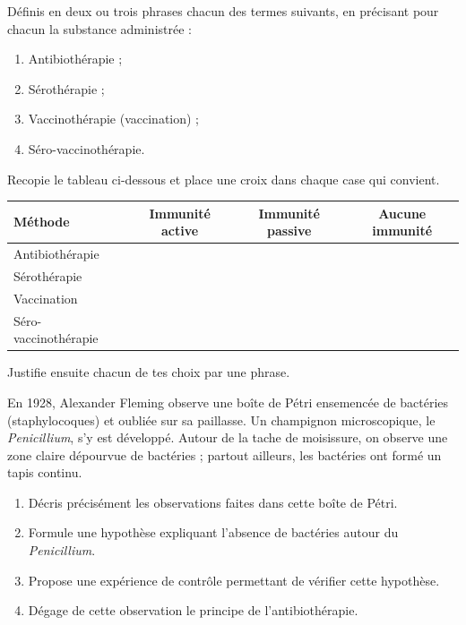 \documentclass[11pt]{article}
\newcounter{popsec}
\newcounter{popsub}
\newcommand{\courssub}[1]{%
  \stepcounter{popsub}%
  \par\vspace{9pt}\noindent{\popxbold\fontsize{11.5}{13}\selectfont\color{popink}{\color{poporange}\thepopsec.\thepopsub}\hspace{6pt}#1}\par\nopagebreak\vspace{4pt}
}
\begin{document}
\begin{exercice}[Définitions]
Définis en deux ou trois phrases chacun des termes suivants, en précisant pour chacun la substance administrée :
\begin{enumerate}
\item Antibiothérapie ;
\item Sérothérapie ;
\item Vaccinothérapie (vaccination) ;
\item Séro-vaccinothérapie.
\end{enumerate}
\end{exercice}

\begin{exercice}
Recopie le tableau ci-dessous et place une croix dans chaque case qui convient.
\begin{center}
\begin{tabular}{|l|c|c|c|}
\hline
\rowcolor{popblueL} Méthode & Immunité active & Immunité passive & Aucune immunité \\
\hline
Antibiothérapie & & & \\
\hline
Sérothérapie & & & \\
\hline
Vaccination & & & \\
\hline
Séro-vaccinothérapie & & & \\
\hline
\end{tabular}
\end{center}
Justifie ensuite chacun de tes choix par une phrase.
\end{exercice}

\courssub{Je m'entraîne}

\begin{exercice}
En 1928, Alexander Fleming observe une boîte de Pétri ensemencée de bactéries (staphylocoques) et oubliée sur sa paillasse. Un champignon microscopique, le \emph{Penicillium}, s'y est développé. Autour de la tache de moisissure, on observe une zone claire dépourvue de bactéries ; partout ailleurs, les bactéries ont formé un tapis continu.
\begin{enumerate}
\item Décris précisément les observations faites dans cette boîte de Pétri.
\item Formule une hypothèse expliquant l'absence de bactéries autour du \emph{Penicillium}.
\item Propose une expérience de contrôle permettant de vérifier cette hypothèse.
\item Dégage de cette observation le principe de l'antibiothérapie.
\end{enumerate}
\end{exercice}
\end{document}
